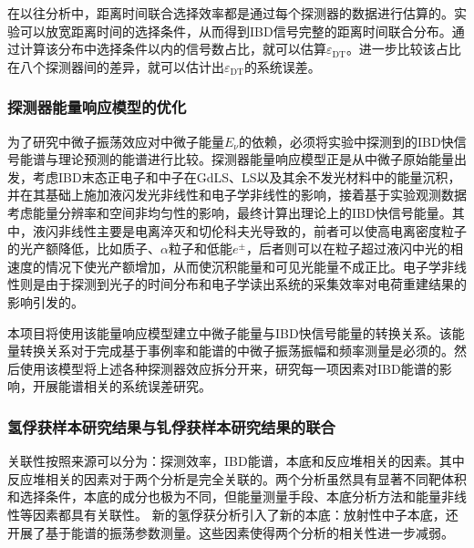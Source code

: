 \documentclass[a4paper,zihao=-4]{article}
\begin{document}
在以往分析中，距离时间联合选择效率都是通过每个探测器的数据进行估算的。实验可以放宽距离时间的选择条件，从而得到IBD信号完整的距离时间联合分布。通过计算该分布中选择条件以内的信号数占比，就可以估算$\varepsilon_{\text{DT}}$。进一步比较该占比在八个探测器间的差异，就可以估计出$\varepsilon_{\text{DT}}$的系统误差。

\subsubsection{探测器能量响应模型的优化}\label{sec:energy-model}
为了研究中微子振荡效应对中微子能量$E_\nu$的依赖，必须将实验中探测到的IBD快信号能谱与理论预测的能谱进行比较。探测器能量响应模型正是从中微子原始能量出发，考虑IBD末态正电子和中子在GdLS、LS以及其余不发光材料中的能量沉积，并在其基础上施加液闪发光非线性和电子学非线性的影响，接着基于实验观测数据考虑能量分辨率和空间非均匀性的影响，最终计算出理论上的IBD快信号能量。其中，液闪非线性主要是电离淬灭和切伦科夫光导致的，前者可以使高电离密度粒子的光产额降低，比如质子、$\alpha$粒子和低能$e^\pm$，后者则可以在粒子超过液闪中光的相速度的情况下使光产额增加，从而使沉积能量和可见光能量不成正比。电子学非线性则是由于探测到光子的时间分布和电子学读出系统的采集效率对电荷重建结果的影响引发的。

本项目将使用该能量响应模型建立中微子能量与IBD快信号能量的转换关系。该能量转换关系对于完成基于事例率和能谱的中微子振荡振幅和频率测量是必须的。然后使用该模型将上述各种探测器效应拆分开来，研究每一项因素对IBD能谱的影响，开展能谱相关的系统误差研究。


\subsubsection{氢俘获样本研究结果与钆俘获样本研究结果的联合}\label{sec:nGdnH-combine}

关联性按照来源可以分为：探测效率，IBD能谱，本底和反应堆相关的因素。其中反应堆相关的因素对于两个分析是完全关联的。两个分析虽然具有显著不同靶体积和选择条件，本底的成分也极为不同，但能量测量手段、本底分析方法和能量非线性等因素都具有关联性。 新的氢俘获分析引入了新的本底：放射性中子本底，还开展了基于能谱的振荡参数测量。这些因素使得两个分析的相关性进一步减弱。
\end{document}
